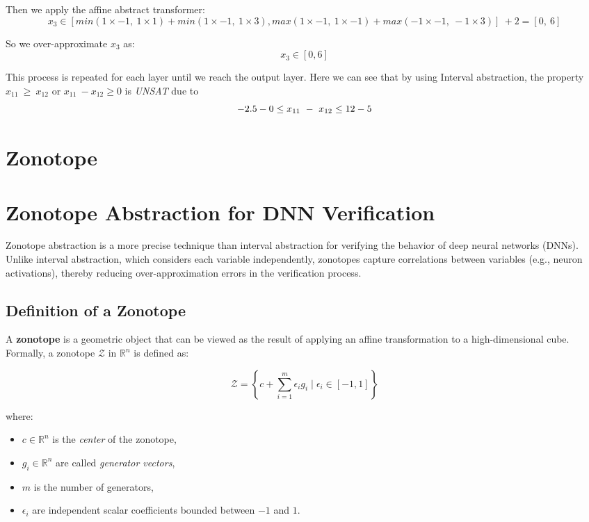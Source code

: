 \documentclass[oneside,11pt,dvipsnames]{book}
\begin{document}
Then we apply the affine abstract transformer:
\[
x_3 \in [min(1\times-1,\ 1\times1) + min(1\times-1,\ 1\times3), max(1\times-1,\ 1\times-1) + max(-1\times-1,\ -1\times3)]\ + 2  = [0,\ 6]
\]

So we over-approximate \(x_3\) as:
\[
x_3 \in [0, 6]
\]

This process is repeated for each layer until we reach the output layer.
Here we can see that by using Interval abstraction, the property \(x_{11}\ \geq\ x_{12}\) or  \(x_{11}\ - x_{12} \geq 0\) is \textit{UNSAT} due to
\[-2.5 - 0  \leq x_{11}\ -\ x_{12} \leq 12 - 5
\\

\]

\section{Zonotope}

\section{Zonotope Abstraction for DNN Verification}

Zonotope abstraction is a more precise technique than interval abstraction for verifying the behavior of deep neural networks (DNNs). Unlike interval abstraction, which considers each variable independently, zonotopes capture correlations between variables (e.g., neuron activations), thereby reducing over-approximation errors in the verification process.

\subsection{Definition of a Zonotope}

A \textbf{zonotope} is a geometric object that can be viewed as the result of applying an affine transformation to a high-dimensional cube. Formally, a zonotope \(\mathcal{Z}\) in \(\mathbb{R}^n\) is defined as:

\[
\mathcal{Z} = \left\{c + \sum_{i=1}^{m} \epsilon_i g_i \mid \epsilon_i \in [-1, 1]\right\}
\]

where:
\begin{itemize}
    \item \(c \in \mathbb{R}^n\) is the \textit{center} of the zonotope,
    \item \(g_i \in \mathbb{R}^n\) are called \textit{generator vectors},
    \item \(m\) is the number of generators,
    \item \(\epsilon_i\) are independent scalar coefficients bounded between \(-1\) and \(1\).
\end{itemize}
\end{document}
